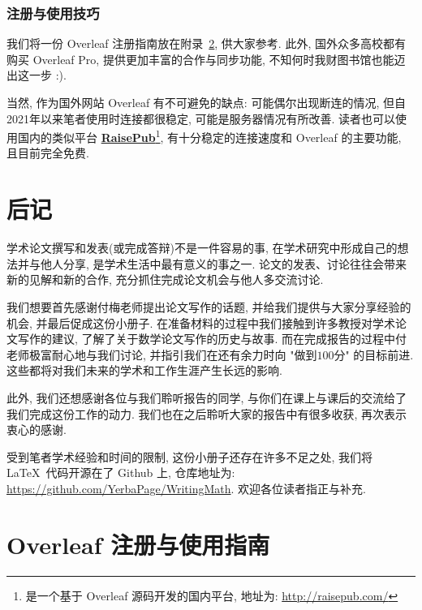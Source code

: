 \documentclass{formatBook}
\begin{document}
\subsection{注册与使用技巧}
我们将一份 Overleaf 注册指南放在附录~\ref{overleafGuide}, 供大家参考. 此外, 国外众多高校都有购买 Overleaf Pro, 提供更加丰富的合作与同步功能, 不知何时我财图书馆也能迈出这一步 :).

当然, 作为国外网站 Overleaf 有不可避免的缺点: 可能偶尔出现断连的情况, 但自2021年以来笔者使用时连接都很稳定, 可能是服务器情况有所改善. 读者也可以使用国内的类似平台 \textbf{\href{http://raisepub.com/}{RaisePub}}\footnote{是一个基于 Overleaf 源码开发的国内平台, 地址为: \url{http://raisepub.com/}}, 有十分稳定的连接速度和 Overleaf 的主要功能, 且目前完全免费.

\chapter{后记}
学术论文撰写和发表(或完成答辩)不是一件容易的事, 在学术研究中形成自己的想法并与他人分享, 是学术生活中最有意义的事之一. 论文的发表、讨论往往会带来新的见解和新的合作, 充分抓住完成论文机会与他人多交流讨论. 

我们想要首先感谢付梅老师提出论文写作的话题, 并给我们提供与大家分享经验的机会, 并最后促成这份小册子. 在准备材料的过程中我们接触到许多教授对学术论文写作的建议, 了解了关于数学论文写作的历史与故事. 而在完成报告的过程中付老师极富耐心地与我们讨论, 并指引我们在还有余力时向 "做到$100$分" 的目标前进. 这些都将对我们未来的学术和工作生涯产生长远的影响.

此外, 我们还想感谢各位与我们聆听报告的同学, 与你们在课上与课后的交流给了我们完成这份工作的动力. 我们也在之后聆听大家的报告中有很多收获, 再次表示衷心的感谢. 

受到笔者学术经验和时间的限制, 这份小册子还存在许多不足之处, 我们将 \LaTeX \ 代码开源在了 Github 上, 仓库地址为: \url{https://github.com/YerbaPage/WritingMath}. 欢迎各位读者指正与补充.

\printbibliography
\appendix
\chapter{Overleaf 注册与使用指南}\label{overleafGuide}

\end{document}
